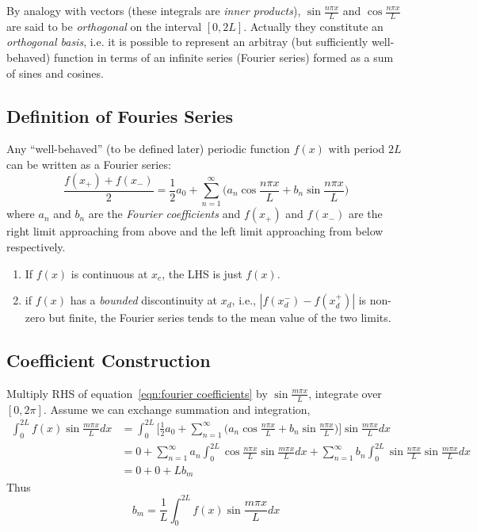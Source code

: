 \documentclass[a4paper]{article}
\begin{document}
By analogy with vectors (these integrals are \emph{inner products}), $\sin \frac{n\pi x}{L}$ and $\cos\frac{n\pi x}{L}$ are said to be \emph{orthogonal} on the interval $[0,2L]$. Actually they constitute an \emph{orthogonal basis}, i.e. it is possible to represent an arbitray (but sufficiently well-behaved) function in terms of an infinite series (Fourier series) formed as a sum of sines and cosines.

\subsection{Definition of Fouries Series}

Any ``well-behaved'' (to be defined later) periodic function $f(x)$ with period $2L$ can be written as a Fourier series:
\begin{equation}
  \label{eqn:fourier coefficients}
  \frac{f(x_+)+f(x_-)}{2} = \frac{1}{2}a_0 + \sum_{n=1}^\infty \Big(a_n\cos\frac{n\pi x}{L} +b_n\sin\frac{n\pi x}{L}\Big)
  \tag{$\ast$}
\end{equation}
where $a_n$ and $b_n$ are the \emph{Fourier coefficients} and $f(x_+)$ and $f(x_-)$ are the right limit approaching from above and the left limit approaching from below respectively.

\begin{enumerate}
\item If $f(x)$ is continuous at $x_c$, the LHS is just $f(x)$.
  \item if $f(x)$ has a \emph{bounded} discontinuity at $x_d$, i.e., $|f(x_d^-)-f(x_d^+)|$ is non-zero but finite, the Fourier series tends to the mean value of the two limits.
\end{enumerate}

\subsection{Coefficient Construction}

Multiply RHS of equation~\eqref{eqn:fourier coefficients} by $\sin \frac{m\pi x}{L}$, integrate over $[0, 2\pi]$. Assume we can exchange summation and integration,
\begin{align*}
  \int_0^{2L} f(x)\sin\frac{m\pi x}{L} dx &= \int_0^{2L} \Bigg[ \frac{1}{2}a_0 + \sum_{n=1}^\infty \Big(a_n\cos\frac{n\pi x}{L} +b_n\sin\frac{n\pi x}{L}\Big) \Bigg] \sin\frac{m\pi x}{L} dx \\
    &= 0 + \sum_{n=1}^\infty a_n \int_0^{2L} \cos\frac{n\pi x}{L} \sin\frac{m\pi x}{L} dx +  \sum_{n=1}^\infty b_n \int_0^{2L} \sin\frac{n\pi x}{L} \sin\frac{m\pi x}{L} dx\\
  &= 0 + 0 + L b_m
    \end{align*}
Thus
\[
  b_m = \frac{1}{L}\int_0^{2L} f(x) \sin\frac{m\pi x}{L} dx
\]
\end{document}
